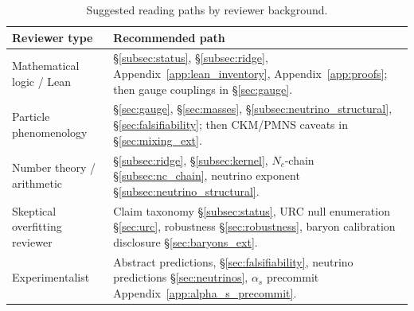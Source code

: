 \documentclass[11pt]{article}
\theoremstyle{remark}
\begin{document}
\begin{table}[H]
\centering
\caption{Suggested reading paths by reviewer background.}
\label{tab:reviewer_routes}
\small
\renewcommand{\arraystretch}{1.15}
\begin{tabularx}{\linewidth}{@{}p{3.2cm}X@{}}
\toprule
\textbf{Reviewer type} & \textbf{Recommended path} \\
\midrule
Mathematical logic / Lean & \S\ref{subsec:status}, \S\ref{subsec:ridge}, Appendix~\ref{app:lean_inventory}, Appendix~\ref{app:proofs}; then gauge couplings in \S\ref{sec:gauge}. \\
Particle phenomenology & \S\ref{sec:gauge}, \S\ref{sec:masses}, \S\ref{subsec:neutrino_structural}, \S\ref{sec:falsifiability}; then CKM/PMNS caveats in \S\ref{sec:mixing_ext}. \\
Number theory / arithmetic & \S\ref{subsec:ridge}, \S\ref{subsec:kernel}, $N_c$-chain \S\ref{subsec:nc_chain}, neutrino exponent \S\ref{subsec:neutrino_structural}. \\
Skeptical overfitting reviewer & Claim taxonomy \S\ref{subsec:status}, URC null enumeration \S\ref{sec:urc}, robustness \S\ref{sec:robustness}, baryon calibration disclosure \S\ref{sec:baryons_ext}. \\
Experimentalist & Abstract predictions, \S\ref{sec:falsifiability}, neutrino predictions \S\ref{sec:neutrinos}, $\alpha_s$ precommit Appendix~\ref{app:alpha_s_precommit}. \\
\bottomrule
\end{tabularx}
\end{table}
\end{document}
